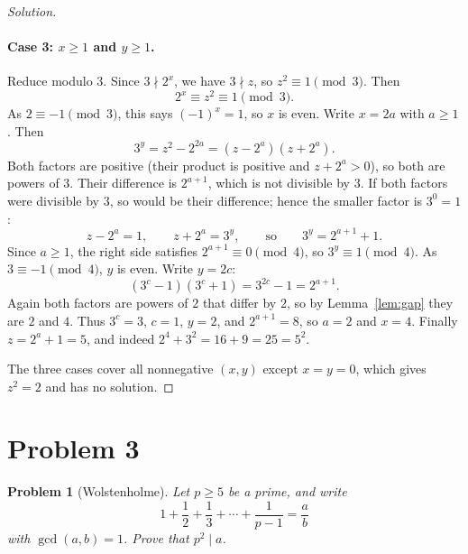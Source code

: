 \documentclass[11pt]{article}
\theoremstyle{problemstyle}
\newtheorem{problem}{Problem}
\theoremstyle{plain}
\newenvironment{solution}{\begin{proof}[Solution]}{\end{proof}}
\begin{document}
\begin{solution}
\paragraph{Case 3: $x \ge 1$ and $y \ge 1$.} Reduce modulo $3$. Since $3 \nmid 2^x$, we have $3 \nmid z$, so $z^2 \equiv 1 \pmod 3$. Then
\[
  2^x \equiv z^2 \equiv 1 \pmod 3.
\]
As $2 \equiv -1 \pmod 3$, this says $(-1)^x = 1$, so $x$ is even. Write $x = 2a$ with $a \ge 1$. Then
\[
  3^y = z^2 - 2^{2a} = (z - 2^a)(z + 2^a).
\]
Both factors are positive (their product is positive and $z + 2^a > 0$), so both are powers of $3$. Their difference is $2^{a+1}$, which is not divisible by $3$. If both factors were divisible by $3$, so would be their difference; hence the smaller factor is $3^0 = 1$:
\[
  z - 2^a = 1, \qquad z + 2^a = 3^y,
  \qquad\text{so}\qquad
  3^y = 2^{a+1} + 1.
\]
Since $a \ge 1$, the right side satisfies $2^{a+1} \equiv 0 \pmod 4$, so $3^y \equiv 1 \pmod 4$. As $3 \equiv -1 \pmod 4$, $y$ is even. Write $y = 2c$:
\[
  (3^c - 1)(3^c + 1) = 3^{2c} - 1 = 2^{a+1}.
\]
Again both factors are powers of $2$ that differ by $2$, so by Lemma~\ref{lem:gap} they are $2$ and $4$. Thus $3^c = 3$, $c = 1$, $y = 2$, and $2^{a+1} = 8$, so $a = 2$ and $x = 4$. Finally $z = 2^a + 1 = 5$, and indeed $2^4 + 3^2 = 16 + 9 = 25 = 5^2$.

The three cases cover all nonnegative $(x, y)$ except $x = y = 0$, which gives $z^2 = 2$ and has no solution.
\end{solution}

\section*{Problem 3}

\begin{problem}[Wolstenholme]
Let $p \ge 5$ be a prime, and write
\[
  1 + \frac{1}{2} + \frac{1}{3} + \cdots + \frac{1}{p - 1} = \frac{a}{b}
\]
with $\gcd(a, b) = 1$. Prove that $p^2 \mid a$.
\end{problem}
\end{document}
